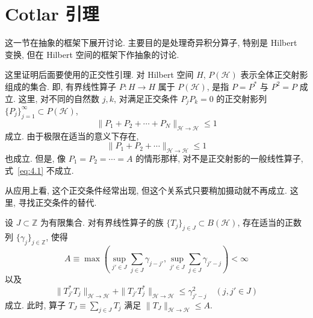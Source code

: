 
\section{Cotlar 引理}\label{sec:4.1}

这一节在抽象的框架下展开讨论. 主要目的是处理奇异积分算子, 特别是 Hilbert 变换, 但在 Hilbert 空间的框架下作抽象的讨论.

这里证明后面要使用的正交性引理. 对 Hilbert 空间 $H$, $P(\mathcal{H})$ 表示全体正交射影组成的集合. 即, 有界线性算子 $P: H \to H$ 属于 $P(\mathcal{H})$, 是指 $P = P^{*}$ 与 $P^{2} = P$ 成立. 这里, 对不同的自然数 $j, k$, 对满足正交条件 $P_{j}P_{k} = 0$ 的正交射影列 $\{P_{j}\}_{j=1}^{\infty} \subset P(\mathcal{H})$,
\begin{equation}\tag{4.1}
\|P_{1} + P_{2} + \cdots + P_{N}\|_{\mathcal{H} \to \mathcal{H}} \leq 1
\label{eq:4.1}
\end{equation}
成立. 由于极限在适当的意义下存在,
\[
\|P_{1} + P_{2} + \cdots\|_{\mathcal{H} \to \mathcal{H}} \leq 1
\]
也成立. 但是, 像 $P_{1} = P_{2} = \cdots = A$ 的情形那样, 对不是正交射影的一般线性算子, 式~\eqref{eq:4.1} 不成立.

从应用上看, 这个正交条件经常出现, 但这个关系式只要稍加摄动就不再成立. 这里, 寻找正交条件的替代.

\begin{theorem}[Cotlar 引理]\label{thm:4.1}
设 $J \subset \mathbb{Z}$ 为有限集合. 对有界线性算子的族 $\{T_{j}\}_{j \in J} \subset B(\mathcal{H})$, 存在适当的正数列 $\{\gamma_{j}\}_{j \in \mathbb{Z}}$, 使得
\begin{equation}\tag{4.2}
A \equiv \max\left(\sup_{j' \in J}\sum_{j \in J}\gamma_{j-j'}, \sup_{j' \in J}\sum_{j \in J}\gamma_{j'-j}\right) < \infty
\label{eq:4.2}
\end{equation}
以及
\begin{equation}\tag{4.3}
\|T_{j'}^{*}T_{j}\|_{\mathcal{H} \to \mathcal{H}} + \|T_{j'}T_{j}^{*}\|_{\mathcal{H} \to \mathcal{H}} \leq \gamma_{j'-j}^{2} \quad (j, j' \in J)
\label{eq:4.3}
\end{equation}
成立. 此时, 算子 $T_{J} \equiv \sum_{j \in J}T_{j}$ 满足 $\|T_{J}\|_{\mathcal{H} \to \mathcal{H}} \leq A$.
\end{theorem}

